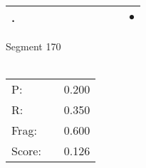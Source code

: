 \documentclass[landscape]{article}
\newcommand{\ssp}{\hspace{2pt}}
\newcommand{\mex}{\cellcolor{g}$\bullet$}
\begin{document}
\begin{tabular}{|l|p{10pt}|p{10pt}|p{10pt}|p{10pt}|p{10pt}|p{10pt}|p{10pt}|p{10pt}|p{10pt}|p{10pt}|}
\hline
\ssp \cellcolor{ref9}. \ssp&\hspace{2pt}&\hspace{2pt}&\hspace{2pt}&\hspace{2pt}&\hspace{2pt}&\hspace{2pt}&\hspace{2pt}&\hspace{2pt}&\hspace{2pt}&\hspace{2pt}\mex\\
\hline
\end{tabular}

\vspace{6pt}
\noindent Segment 170\\\\
\noindent\begin{tabular}{lm{12pt}r}
\hline
P:&&0.200\\
R:&&0.350\\
Frag:&&0.600\\
Score:&&0.126\\
\end{tabular}

\newpage
\end{document}
